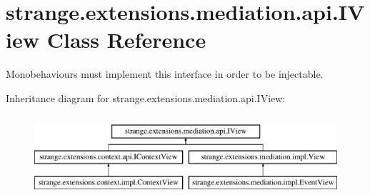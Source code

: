 \hypertarget{interfacestrange_1_1extensions_1_1mediation_1_1api_1_1_i_view}{\section{strange.\-extensions.\-mediation.\-api.\-I\-View Class Reference}
\label{interfacestrange_1_1extensions_1_1mediation_1_1api_1_1_i_view}
}


Monobehaviours must implement this interface in order to be injectable.  


Inheritance diagram for strange.\-extensions.\-mediation.\-api.\-I\-View\-:\begin{figure}[H]
\begin{center}
\leavevmode
\includegraphics[height=3.000000cm]{interfacestrange_1_1extensions_1_1mediation_1_1api_1_1_i_view}
\end{center}
\end{figure}
